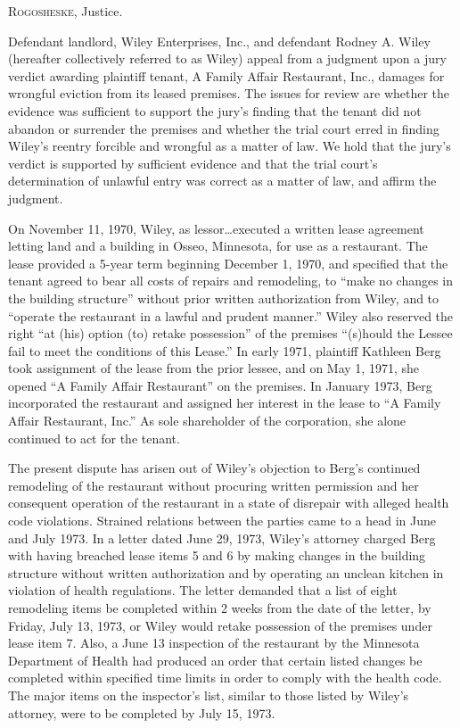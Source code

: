 

\opinion \textsc{Rogosheske}, Justice.

Defendant landlord, Wiley Enterprises, Inc., and
defendant Rodney A. Wiley (hereafter collectively
referred to as Wiley) appeal from a judgment upon a
jury verdict awarding plaintiff tenant, A Family Affair Restaurant, Inc.,
damages for wrongful eviction from its leased premises. The issues for review
are whether the evidence was sufficient to support the jury's finding that the
tenant did not abandon or surrender the premises and whether the trial court
erred in finding Wiley's reentry forcible and wrongful
as a matter of law. We hold that the jury's verdict is supported by sufficient
evidence and that the trial court's determination of unlawful entry was correct
as a matter of law, and affirm the judgment.

On November 11, 1970, Wiley, as lessor\ldots executed a
written lease agreement letting land and a building in Osseo, Minnesota, for
use as a restaurant. The lease provided a 5-year term beginning December 1,
1970, and specified that the tenant agreed to bear all costs of repairs and
remodeling, to ``make no changes in the building structure'' without prior
written authorization from Wiley, and to ``operate the
restaurant in a lawful and prudent manner.'' Wiley also
reserved the right ``at (his) option (to) retake possession'' of the premises
``(s)hould the Lessee fail to meet the conditions of this
Lease.'' In early 1971, plaintiff Kathleen
Berg took assignment of the lease from the prior
lessee, and on May 1, 1971, she opened ``A Family Affair Restaurant'' on the
premises. In January 1973, Berg incorporated the
restaurant and assigned her interest in the lease to ``A Family Affair
Restaurant, Inc.'' As sole shareholder of the corporation, she alone continued
to act for the tenant.

The present dispute has arisen out of Wiley's objection
to Berg's continued remodeling of the restaurant
without procuring written permission and her consequent operation of the
restaurant in a state of disrepair with alleged health code violations.
Strained relations between the parties came to a head in June and July 1973. In
a letter dated June 29, 1973, Wiley's attorney charged
Berg with having breached lease items 5 and 6 by making
changes in the building structure without written authorization and by
operating an unclean kitchen in violation of health regulations. The letter
demanded that a list of eight remodeling items be completed within 2 weeks from
the date of the letter, by Friday, July 13, 1973, or
Wiley would retake possession of the premises under
lease item 7. Also, a June 13 inspection of the restaurant by the Minnesota
Department of Health had produced an order that certain listed changes be
completed within specified time limits in order to comply with the health code.
The major items on the inspector's list, similar to those listed by
Wiley's attorney, were to be completed by July 15,
1973.

